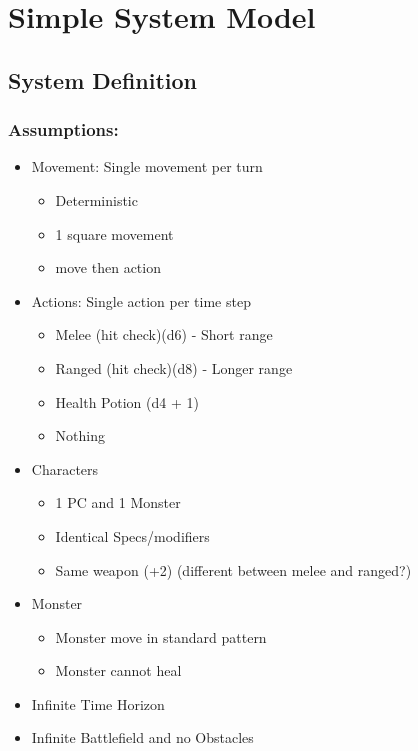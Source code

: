 \documentclass[9pt, onecolumn]{report}
\begin{document}

\chapter{Simple System Model}
\section{System Definition}
\subsection{Assumptions:}
\begin{itemize}
    \item Movement: Single movement per turn
    \begin{itemize}
        \item Deterministic
        \item 1 square movement
        \item move then action
    \end{itemize}
    \item Actions: Single action per time step
    \begin{itemize}
        \item Melee (hit check)(d6) - Short range
        \item Ranged (hit check)(d8) - Longer range
        \item Health Potion (d4 + 1)
        \item Nothing
    \end{itemize}
    \item Characters
    \begin{itemize}
        \item 1 PC and 1 Monster
        \item Identical Specs/modifiers
        \item Same weapon (+2) {\color{red} (different between melee and ranged?)}
    \end{itemize}
    \item Monster
    \begin{itemize}
        \item Monster move in standard pattern
        \item Monster cannot heal
    \end{itemize}
    \item Infinite Time Horizon
    \item Infinite Battlefield and no Obstacles
\end{itemize}
\end{document}
